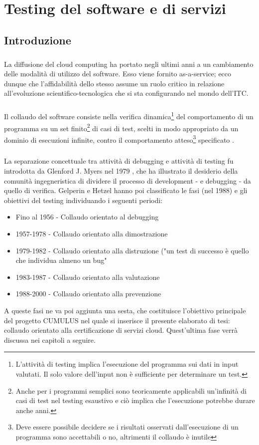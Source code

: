 \documentclass[../main.tex]{subfiles}
\begin{document}
\chapter{Testing del software e di servizi}
\section{Introduzione}
\paragraph{}La diffusione del cloud computing ha portato negli ultimi anni a un cambiamento delle modalità di utilizzo del software. Esso viene fornito as-a-service; ecco dunque che l'affidabilità dello stesso assume un ruolo critico in relazione all'evoluzione scientifico-tecnologica che si sta configurando nel mondo dell'ITC.\newline
\paragraph{}
Il collaudo del software consiste nella verifica dinamica\footnote{L'attività di testing implica l'esecuzione del programma sui dati in input valutati. Il solo valore dell'input non è sufficiente per determinare un test.} del comportamento di un programma su un set finito\footnote{Anche per i programmi semplici sono teoricamente applicabili un'infinità di casi di test nel testing esaustivo e ciò implica che l'esecuzione potrebbe durare anche anni.} di casi di test, scelti in modo appropriato da un dominio di esecuzioni infinite, contro il comportamento atteso\footnote{Deve essere possibile decidere se i risultati osservati dall'esecuzione di un programma sono accettabili o no, altrimenti il collaudo è inutile} specificato \cite{AntoniaBertolino03}.
\paragraph{}
La separazione concettuale tra attività di debugging e attività di testing fu introdotta da Glenford J. Myers nel 1979 \cite{ArtOfSwTesting}, che ha illustrato il desiderio della comunità ingegneristica di dividere il processo di development - e debugging - da quello di verifica.
Gelperin e Hetzel \cite{GrowthOfSwTesting} hanno poi classificato le fasi (nel 1988) e gli obiettivi del testing individuando i seguenti periodi:
\begin{itemize}
\item Fino al 1956 - Collaudo orientato al debugging
\item 1957-1978 - Collaudo orientato alla dimostrazione
\item 1979-1982 - Collaudo orientato alla distruzione ("un test di successo è quello che individua almeno un bug" \cite{ArtOfSwTesting}
\item 1983-1987 - Collaudo orientato alla valutazione
\item 1988-2000 - Collaudo orientato alla prevenzione
\end{itemize}
A queste fasi ne va poi aggiunta una sesta, che costituisce l'obiettivo principale del progetto CUMULUS nel quale si inserisce il presente elaborato di tesi: collaudo orientato alla certificazione di servizi cloud.
Quest'ultima fase verrà discussa nei capitoli a seguire.
\end{document}
